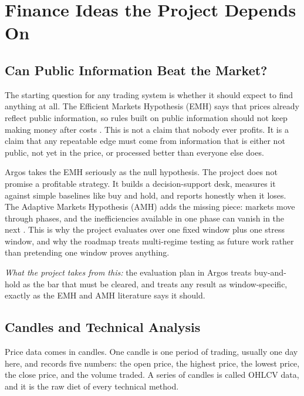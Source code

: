 \documentclass[conference]{IEEEtran}
\newcommand{\sys}{Argos}
\begin{document}
\section{Finance Ideas the Project Depends On}
\label{sec:finance}

\subsection{Can Public Information Beat the Market?}

The starting question for any trading system is whether it should expect to find anything at all. The Efficient Markets Hypothesis (EMH) says that prices already reflect public information, so rules built on public information should not keep making money after costs \cite{fama1970efficient}. This is not a claim that nobody ever profits. It is a claim that any repeatable edge must come from information that is either not public, not yet in the price, or processed better than everyone else does.

\sys{} takes the EMH seriously as the null hypothesis. The project does not promise a profitable strategy. It builds a decision-support desk, measures it against simple baselines like buy and hold, and reports honestly when it loses. The Adaptive Markets Hypothesis (AMH) adds the missing piece: markets move through phases, and the inefficiencies available in one phase can vanish in the next \cite{lo2004adaptive}. This is why the project evaluates over one fixed window plus one stress window, and why the roadmap treats multi-regime testing as future work rather than pretending one window proves anything.

\emph{What the project takes from this:} the evaluation plan in \sys{} treats buy-and-hold as the bar that must be cleared, and treats any result as window-specific, exactly as the EMH and AMH literature says it should.

\subsection{Candles and Technical Analysis}

Price data comes in candles. One candle is one period of trading, usually one day here, and records five numbers: the open price, the highest price, the lowest price, the close price, and the volume traded. A series of candles is called OHLCV data, and it is the raw diet of every technical method.
\end{document}
